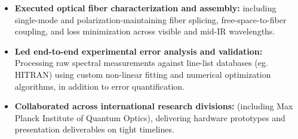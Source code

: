 \documentclass[a4paper,9pt]{extarticle}
\begin{document}
\begin{itemize}
		\item \textbf{Executed optical fiber characterization and assembly:}
		\newline
		including single-mode and polarization-maintaining fiber splicing, free-space-to-fiber coupling, and loss minimization across visible and mid-IR wavelengths.
		
		\item \textbf{Led end-to-end experimental error analysis and validation:} \newline
		Processing raw spectral measurements against line-list databases (eg. HITRAN) using custom non-linear fitting and numerical optimization algorithms, in addition to error quantification.
		
		\item \textbf{Collaborated across international research divisions:} \newline
		(including Max Planck Institute of Quantum Optics), delivering hardware prototypes and presentation deliverables on tight timelines.
		
	\end{itemize}
	
\end{document}
